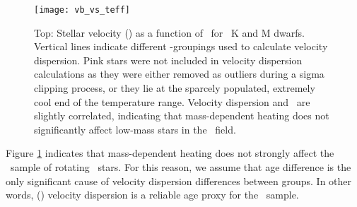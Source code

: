 \begin{figure}
  \caption{
      Top: Stellar velocity (\vb) as a function of \teff\ for
      \kepler\ K and M dwarfs.
Vertical lines indicate different \teff-groupings used to calculate velocity
    dispersion.
Pink stars were not included in velocity dispersion calculations as they were
    either removed as outliers during a sigma clipping process, or they lie at
    the sparcely populated, extremely cool end of the temperature range.
    Velocity dispersion and \teff\ are slightly correlated,
    indicating that mass-dependent heating does not significantly affect
    low-mass stars in the \kepler\ field.
}
  \centering
    \texttt{[image: vb\_vs\_teff]}
\label{fig:vb_vs_teff}
\end{figure}
Figure \ref{fig:vb_vs_teff} indicates that mass-dependent heating does not
strongly affect the \mct\ sample of rotating \kepler\ stars.
For this reason, we assume that age difference is the only significant cause
of velocity dispersion differences between groups.
In other words, (\vb) velocity dispersion is a reliable age proxy for the
\mct\ sample.



